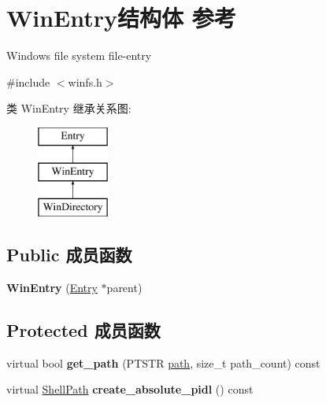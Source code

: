 \hypertarget{struct_win_entry}{}\section{Win\+Entry结构体 参考}
\label{struct_win_entry}


Windows file system file-\/entry  




{\ttfamily \#include $<$winfs.\+h$>$}

类 Win\+Entry 继承关系图\+:\begin{figure}[H]
\begin{center}
\leavevmode
\includegraphics[height=3.000000cm]{struct_win_entry}
\end{center}
\end{figure}
\subsection*{Public 成员函数}
\begin{DoxyCompactItemize}
\item 
\mbox{\label{struct_win_entry_a4ad4fca54c1dba40b30b42107ee2b14d}} 
{\bfseries Win\+Entry} (\hyperlink{struct_entry}{Entry} $\ast$parent)
\end{DoxyCompactItemize}
\subsection*{Protected 成员函数}
\begin{DoxyCompactItemize}
\item 
\mbox{\label{struct_win_entry_a5390cc389b8f49c0504bf77a2e197859}} 
virtual bool {\bfseries get\+\_\+path} (P\+T\+S\+TR \hyperlink{structpath}{path}, size\+\_\+t path\+\_\+count) const
\item 
\mbox{\label{struct_win_entry_ade0f309387281644bfd4ad2c3d034199}} 
virtual \hyperlink{struct_shell_path}{Shell\+Path} {\bfseries create\+\_\+absolute\+\_\+pidl} () const
\end{DoxyCompactItemize}
